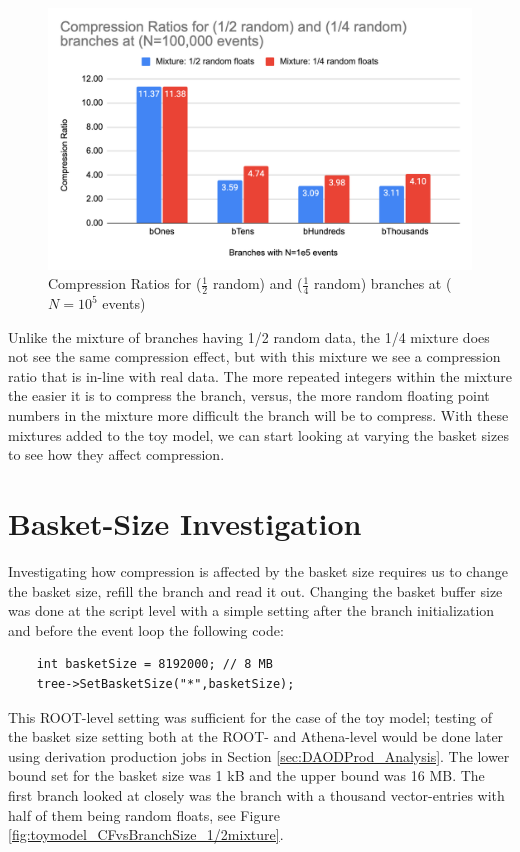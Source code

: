 \begin{figure}[h]
    \centering
    \vspace{20px}
    \includegraphics[width=.8\textwidth]{content/toymodel_content/Compression Ratios for (1_2 random) and (1_4 random) branches at (N=100,000 events).png}
    \caption{Compression Ratios for ($\frac{1}{2}$ random) and ($\frac{1}{4}$ random) branches at ($N=10^5$ events)}
    \vspace{20px}
    \label{fig:toymodel_compF_1e5_mix_random}
\end{figure}

Unlike the mixture of branches having 1/2 random data, the 1/4 mixture does not see the same compression effect, but with this mixture we see a compression ratio that is in-line with real data.
The more repeated integers within the mixture the easier it is to compress the branch, versus, the more random floating point numbers in the mixture more difficult the branch will be to compress.
With these mixtures added to the toy model, we can start looking at varying the basket sizes to see how they affect compression.

\section{Basket-Size Investigation}
\label{sec: toy-model basket-size investigation}

Investigating how compression is affected by the basket size requires us to change the basket size, refill the branch and read it out.
Changing the basket buffer size was done at the script level with a simple setting after the branch initialization and before the event loop the following code:
\pagebreak
\begin{lstlisting}
    int basketSize = 8192000; // 8 MB
    tree->SetBasketSize("*",basketSize);
\end{lstlisting}
This ROOT-level setting was sufficient for the case of the toy model; testing of the basket size setting both at the ROOT- and Athena-level would be done later using derivation production jobs in Section \ref{sec:DAODProd_Analysis}.
The lower bound set for the basket size was 1 kB and the upper bound was 16 MB.
The first branch looked at closely was the branch with a thousand vector-entries with half of them being random floats, see Figure \ref{fig:toymodel_CFvsBranchSize_1/2mixture}.

